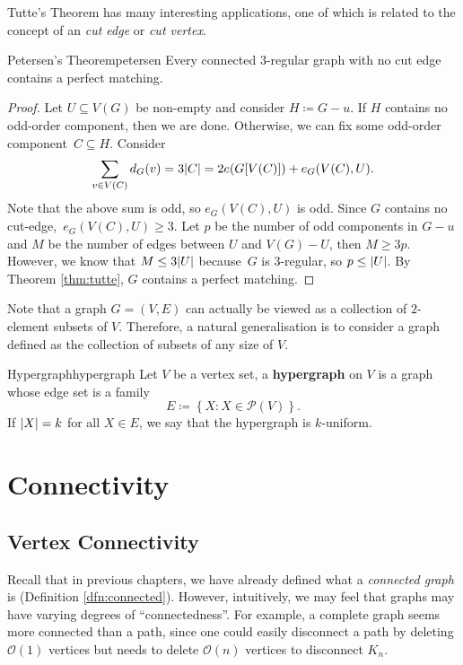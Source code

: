 \documentclass[math]{amznotes}
\theoremstyle{remark}
\begin{document}
Tutte's Theorem has many interesting applications, one of which is related to the concept of an \textit{cut edge} or \textit{cut vertex}.
\begin{thmbox}{Petersen's Theorem}{petersen}
    Every connected $3$-regular graph with no cut edge contains a perfect matching.
    \tcblower
    \begin{proof}
        Let $U \subseteq V(G)$ be non-empty and consider $H \coloneqq G - u$. If $H$ contains no odd-order component, then we are done. Otherwise, we can fix some odd-order component~$C \subseteq H$. Consider
        \begin{equation*}
            \sum_{v \in V(C)}d_G(v) = 3{\left\lvert {C} \right\rvert} = 2e(G[V(C)]) + e_G(V(C), U).
        \end{equation*}
        Note that the above sum is odd, so $e_G(V(C), U)$ is odd. Since $G$ contains no cut-edge,~$e_G(V(C), U) \geq 3$. Let $p$ be the number of odd components in $G - u$ and $M$ be the number of edges between $U$ and $V(G) - U$, then $M \geq 3p$. However, we know that $M \leq 3{\left\lvert {U} \right\rvert}$ because~$G$ is $3$-regular, so $p \leq {\left\lvert {U} \right\rvert}$. By Theorem \ref{thm:tutte}, $G$ contains a perfect matching.
    \end{proof}
\end{thmbox}
Note that a graph $G = (V, E)$ can actually be viewed as a collection of $2$-element subsets of $V$. Therefore, a natural generalisation is to consider a graph defined as the collection of subsets of any size of $V$.
\begin{dfnbox}{Hypergraph}{hypergraph}
    Let $V$ be a vertex set, a {\color{red} \textbf{hypergraph}} on $V$ is a graph whose edge set is a family
    \begin{equation*}
        E \coloneqq \left\{X \colon X \in \mathcal{P}(V)\right\}.
    \end{equation*}
    If ${\left\lvert {X} \right\rvert} = k$ for all $X \in E$, we say that the hypergraph is $k$-uniform.
\end{dfnbox}
\chapter{Connectivity}
\section{Vertex Connectivity}
Recall that in previous chapters, we have already defined what a \textit{connected graph} is (Definition \ref{dfn:connected}). However, intuitively, we may feel that graphs may have varying degrees of ``connectedness''. For example, a complete graph seems more connected than a path, since one could easily disconnect a path by deleting $\mathcal{O}(1)$ vertices but needs to delete $\mathcal{O}(n)$ vertices to disconnect $K_n$.
\end{document}
